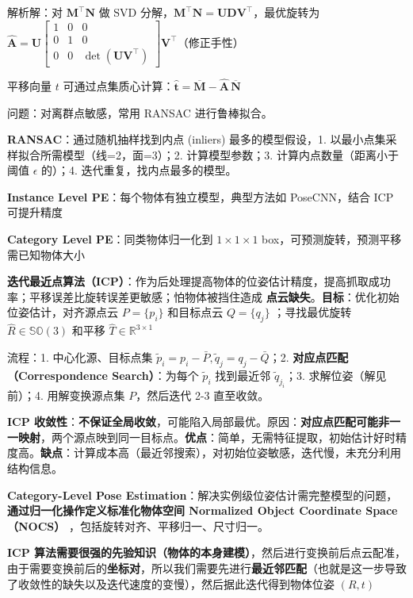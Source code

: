 \documentclass[
  8pt]{extarticle}
\begin{document}
\begin{multicols*}{4}
解析解：对 \(\mathbf{M}^\top\mathbf{N}\) 做 SVD
分解，\(\mathbf{M}^\top\mathbf{N} = \mathbf{UDV}^\top\)，最优旋转为
\(\hat{\mathbf{A}} = \mathbf{U}\begin{bmatrix} 1 & 0 & 0 \\ 0 & 1 & 0 \\ 0 & 0 & \det(\mathbf{UV}^{\top}) \end{bmatrix}\mathbf{V}^{\top}\)（修正手性）

平移向量 \(t\)
可通过点集质心计算：\(\hat{\mathbf{t}} = \overline{\mathbf{M}} - \hat{\mathbf{A}}\,\overline{\mathbf{N}}\)

问题：对离群点敏感，常用 RANSAC 进行鲁棒拟合。

\textbf{RANSAC}：通过随机抽样找到内点 (inliers) 最多的模型假设，1.
以最小点集采样拟合所需模型（线=2，面=3）；2. 计算模型参数；3.
计算内点数量（距离小于阈值 \(\epsilon\) 的）；4.
迭代重复，找内点最多的模型。

\textbf{Instance Level PE}：每个物体有独立模型，典型方法如 PoseCNN，结合
ICP 可提升精度

\textbf{Category Level PE}：同类物体归一化到 \(1\times1\times1\)
box，可预测旋转，预测平移需已知物体大小

\textbf{迭代最近点算法（ICP）}：作为后处理提高物体的位姿估计精度，提高抓取成功率；平移误差比旋转误差更敏感；怕物体被挡住造成
\textbf{点云缺失}。\textbf{目标}：优化初始位姿估计，对齐源点云
\(P = \{p_i\}\) 和目标点云 \(Q = \{q_j\}\) ；寻找最优旋转
\(\hat{R} \in\mathbb{SO}(3)\) 和平移
\(\hat{T}\in\mathbb{R}^{3\times 1}\)

流程：1. 中心化源、目标点集
\(\tilde{p}_i = p_i - \bar{P}, \tilde{q}_j = q_j - \bar{Q}\)；2.
\textbf{对应点匹配（Correspondence Search）}：为每个 \(\tilde{p}_i\)
找到最近邻 \(\tilde{q}_{j_i}\)；3. 求解位姿（解见前）；4. 用解变换源点集
\(P\)，然后迭代 2-3 直至收敛。

\textbf{ICP
收敛性}：\textbf{不保证全局收敛}，可能陷入局部最优。原因：\textbf{对应点匹配可能非一一映射}，两个源点映到同一目标点。\textbf{优点}：简单，无需特征提取，初始估计好时精度高。\textbf{缺点}：计算成本高（最近邻搜索），对初始位姿敏感，迭代慢，未充分利用结构信息。

\textbf{Category-Level Pose
Estimation}：解决实例级位姿估计需完整模型的问题，\textbf{通过归一化操作定义标准化物体空间
Normalized Object Coordinate Space（NOCS）}
，包括旋转对齐、平移归一、尺寸归一。

\textbf{ICP
算法需要很强的先验知识（物体的本身建模）}，然后进行变换前后点云配准，由于需要变换前后的\textbf{坐标对}，所以我们需要先进行\textbf{最近邻匹配}（也就是这一步导致了收敛性的缺失以及迭代速度的变慢），然后据此迭代得到物体位姿
\((R,t)\)


\end{multicols*}
\end{document}
